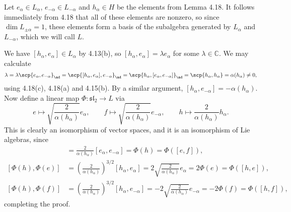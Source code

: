 Let $e_\alpha \in L_\alpha$, $e_{-\alpha} \in L_{-\alpha}$ and $h_\alpha \in H$
be the elements from Lemma 4.18. It follows immediately from 4.18 that all of these
elements are nonzero, so since $\dim L_{\pm\alpha} = 1$, these elements form a basis of
the subalgebra generated by $L_\alpha$ and $L_{-\alpha}$, which we will call
$L$.

We have $[h_\alpha, e_\alpha] \in L_\alpha$ by 4.13(b), so $[h_\alpha, e_\alpha] = \lambda e_\alpha$
for some $\lambda \in \mathbb{C}$. We may calculate
\[ \lambda = \lambda\scp{e_\alpha, e_{-\alpha}}_{\ad} = \scp{[h_\alpha, e_\alpha], e_{-\alpha}}_{\ad} = \scp{h_\alpha, [e_\alpha, e_{-\alpha}]}_{\ad} = \scp{h_\alpha, h_\alpha}= \alpha(h_\alpha)\neq 0, \]
using 4.18(c), 4.18(a) and 4.15(b). By a similar argument,
$[h_\alpha, e_{-\alpha}] = -\alpha(h_\alpha)$. Now define a linear map
$\Phi\colon \mathfrak{sl}_2\to L$ via
\[ e\mapsto \sqrt{\frac{2}{\alpha(h_\alpha)}}e_\alpha,\qquad f\mapsto \sqrt{\frac{2}{\alpha(h_\alpha)}}e_{-\alpha},\qquad h\mapsto \frac{2}{\alpha(h_\alpha)}h_\alpha. \]
This is clearly an isomorphism of vector spaces, and it is an isomorphism of Lie algebras,
since
\begin{align*}
	[\Phi(e), \Phi(f)] &= \frac{2}{\alpha(h_\alpha)}[e_\alpha, e_{-\alpha}] = \Phi(h) = \Phi([e, f]),\\
	[\Phi(h), \Phi(e)] &= \left(\frac{2}{\alpha(h_\alpha)}\right)^{3/2}[h_\alpha, e_\alpha] = 2\sqrt{\frac{2}{\alpha(h_\alpha)}}e_\alpha = 2\Phi(e) = \Phi([h, e]),\\
	[\Phi(h), \Phi(f)] &= \left(\frac{2}{\alpha(h_\alpha)}\right)^{3/2}[h_\alpha, e_{-\alpha}] = -2\sqrt{\frac{2}{\alpha(h_\alpha)}}e_{-\alpha} = -2\Phi(f) = \Phi([h, f]),
\end{align*}
completing the proof.
